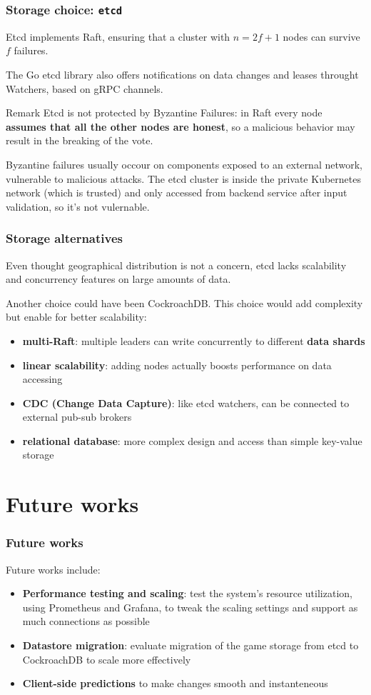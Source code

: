 \documentclass{beamer}
\begin{document}
\begin{frame}
\frametitle{Storage choice: \texttt{etcd}}
Etcd implements Raft, ensuring that a cluster with $n=2f+1$ nodes can survive $f$ failures.

The Go etcd library also offers notifications on data changes and leases throught Watchers, based on gRPC channels.

\begin{block}{Remark}
Etcd \alert{is not protected by Byzantine Failures}: in Raft every node \textbf{assumes that all the other
nodes are honest}, so a malicious behavior may result in the breaking of the vote.
\end{block}
Byzantine failures usually occour on components exposed to an external network, vulnerable to malicious attacks.
The etcd cluster is inside the private Kubernetes network (which is trusted) and only accessed from backend
service after input validation, so it's not vulernable.
\end{frame}

\begin{frame}
\frametitle{Storage alternatives}
Even thought geographical distribution is not a concern, etcd lacks scalability and concurrency features on large
amounts of data.

Another choice could have been CockroachDB. This choice would add complexity but enable for better scalability:
\begin{itemize}
    \item {\color{ForestGreen}\textbf{multi-Raft}}: multiple leaders can write concurrently to different \textbf{data shards}
    \item {\color{ForestGreen}\textbf{linear scalability}}: adding nodes actually boosts performance on data accessing
    \item {\color{ForestGreen}\textbf{CDC (Change Data Capture)}}: like etcd watchers, can be connected to external pub-sub brokers
    \item {\color{Bittersweet}\textbf{relational database}}: more complex design and access than simple key-value storage
\end{itemize}
\end{frame}

\section{Future works}\label{sec:future}

\begin{frame}
    \frametitle{Future works}
    Future works include:
    \begin{itemize}
        \item \textbf{Performance testing and scaling}: test the system's resource utilization, using
            Prometheus and Grafana, to tweak the scaling settings and support as much connections
            as possible
        \item \textbf{Datastore migration}: evaluate migration of the game storage from etcd to CockroachDB to
            scale more effectively
        \item \textbf{Client-side predictions} to make changes smooth and instanteneous
    \end{itemize}
\end{frame}
\end{document}
